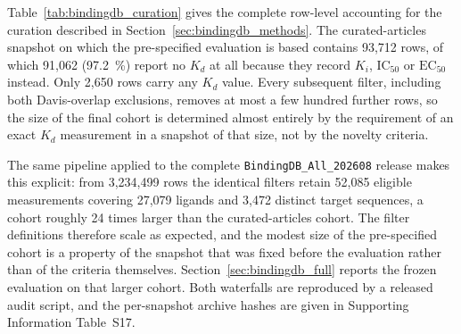 \documentclass[fleqn,10pt]{wlscirep}
\begin{document}
Table~\ref{tab:bindingdb_curation} gives the complete row-level accounting for
the curation described in Section~\ref{sec:bindingdb_methods}.  The
curated-articles snapshot on which the pre-specified evaluation is based
contains 93{,}712 rows, of which 91{,}062 (\SI{97.2}{\percent}) report no $K_d$
at all because they record $K_i$, $\mathrm{IC}_{50}$ or $\mathrm{EC}_{50}$
instead.  Only 2{,}650 rows carry any $K_d$ value.  Every subsequent filter,
including both Davis-overlap exclusions, removes at most a few hundred further
rows, so the size of the final cohort is determined almost entirely by the
requirement of an exact $K_d$ measurement in a snapshot of that size, not by
the novelty criteria.

The same pipeline applied to the complete \texttt{BindingDB\_All\_202608}
release makes this explicit: from 3{,}234{,}499 rows the identical filters
retain 52{,}085 eligible measurements covering 27{,}079 ligands and 3{,}472
distinct target sequences, a cohort roughly 24 times larger than the
curated-articles cohort.  The filter definitions therefore scale as expected,
and the modest size of the pre-specified cohort is a property of the snapshot
that was fixed before the evaluation rather than of the criteria themselves.
Section~\ref{sec:bindingdb_full} reports the frozen evaluation on that larger
cohort.  Both waterfalls are reproduced by a released audit script, and the
per-snapshot archive hashes are given in Supporting Information Table~S17.
\end{document}
